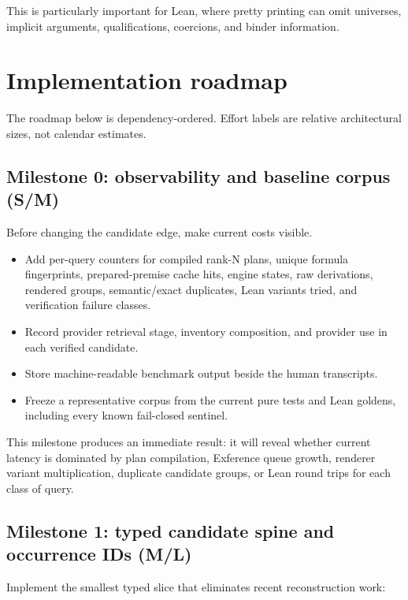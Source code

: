 \documentclass[11pt]{article}
\newcommand{\Exference}{Exference}
\begin{document}
This is particularly important for Lean, where pretty printing can omit
universes, implicit arguments, qualifications, coercions, and binder
information.

\section{Implementation roadmap}
\label{sec:roadmap}

The roadmap below is dependency-ordered.  Effort labels are relative
architectural sizes, not calendar estimates.

\subsection{Milestone 0: observability and baseline corpus (S/M)}

Before changing the candidate edge, make current costs visible.

\begin{itemize}
  \item Add per-query counters for compiled rank-N plans, unique formula
    fingerprints, prepared-premise cache hits, engine states, raw derivations,
    rendered groups, semantic/exact duplicates, Lean variants tried, and
    verification failure classes.
  \item Record provider retrieval stage, inventory composition, and provider
    use in each verified candidate.
  \item Store machine-readable benchmark output beside the human transcripts.
  \item Freeze a representative corpus from the current pure tests and Lean
    goldens, including every known fail-closed sentinel.
\end{itemize}

This milestone produces an immediate result: it will reveal whether current
latency is dominated by plan compilation, \Exference{} queue growth, renderer
variant multiplication, duplicate candidate groups, or Lean round trips for
each class of query.

\subsection{Milestone 1: typed candidate spine and occurrence IDs (M/L)}

Implement the smallest typed slice that eliminates recent reconstruction work:
\end{document}

